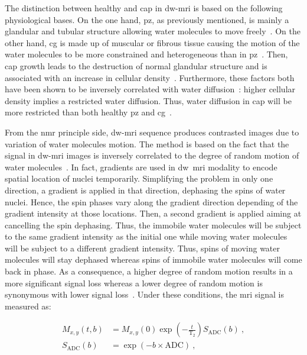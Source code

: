 The distinction between healthy and \ac{cap} in \ac{dw}-\ac{mri} is based on the following physiological bases.
On the one hand, \ac{pz}, as previously mentioned, is mainly a glandular and tubular structure allowing water molecules to move freely~\cite{Choi2007,Hoeks2011}.
On the other hand, \ac{cg} is made up of muscular or fibrous tissue causing the motion of the water molecules to be more constrained and heterogeneous than in \ac{pz}~\cite{Hoeks2011}.
Then, \ac{cap} growth leads to the destruction of normal glandular structure and is associated with an increase in cellular density~\cite{Hoeks2011,Koh2007,Somford2008}.
Furthermore, these factors both have been shown to be inversely correlated with water diffusion~\cite{Koh2007,Somford2008}: higher cellular density implies a restricted water diffusion.
Thus, water diffusion in \ac{cap} will be more restricted than both healthy \ac{pz} and \ac{cg}~\cite{Koh2007,Hoeks2011}.

From the \ac{nmr} principle side, \ac{dw}-\ac{mri} sequence produces contrasted images due to variation of water molecules motion.
The method is based on the fact that the signal in \ac{dw}-\ac{mri} images is inversely correlated to the degree of random motion of water molecules~\cite{Huisman2003}.
In fact, gradients are used in \ac{dw}~\ac{mri} modality to encode spatial location of nuclei temporarily.
Simplifying the problem in only one direction, a gradient is applied in that direction, dephasing the spins of water nuclei.
Hence, the spin phases vary along the gradient direction depending of the gradient intensity at those locations.
Then, a second gradient is applied aiming at cancelling the spin dephasing.
Thus, the immobile water molecules will be subject to the same gradient intensity as the initial one while moving water molecules will be subject to a different gradient intensity.
Thus, spins of moving water molecules will stay dephased whereas spins of immobile water molecules will come back in phase.
As a consequence, a higher degree of random motion results in a more significant signal loss whereas a lower degree of random motion is synonymous with lower signal loss~\cite{Huisman2003}.
Under these conditions, the \ac{mri} signal is measured as:

\begin{align}
  M_{x,y}\left(t,b\right) & = M_{x,y}(0) \exp \left( - \frac{t}{\text{T}_2} \right) S_{\text{ADC}}(b) \ , \label{eq:t2dif} \\
  S_{\text{ADC}}(b) & = \exp \left( -b \times \text{ADC} \right) \ , \label{eq:dif}
\end{align}

